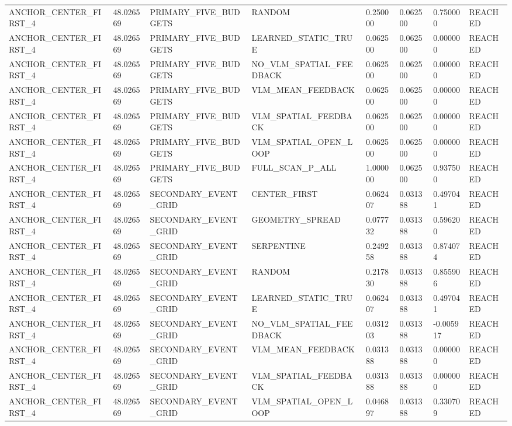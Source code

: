 \begin{tabular}{llllllll}
ANCHOR\_CENTER\_FIRST\_4 & 48.026569 & PRIMARY\_FIVE\_BUDGETS & RANDOM & 0.250000 & 0.062500 & 0.750000 & REACHED \\
ANCHOR\_CENTER\_FIRST\_4 & 48.026569 & PRIMARY\_FIVE\_BUDGETS & LEARNED\_STATIC\_TRUE & 0.062500 & 0.062500 & 0.000000 & REACHED \\
ANCHOR\_CENTER\_FIRST\_4 & 48.026569 & PRIMARY\_FIVE\_BUDGETS & NO\_VLM\_SPATIAL\_FEEDBACK & 0.062500 & 0.062500 & 0.000000 & REACHED \\
ANCHOR\_CENTER\_FIRST\_4 & 48.026569 & PRIMARY\_FIVE\_BUDGETS & VLM\_MEAN\_FEEDBACK & 0.062500 & 0.062500 & 0.000000 & REACHED \\
ANCHOR\_CENTER\_FIRST\_4 & 48.026569 & PRIMARY\_FIVE\_BUDGETS & VLM\_SPATIAL\_FEEDBACK & 0.062500 & 0.062500 & 0.000000 & REACHED \\
ANCHOR\_CENTER\_FIRST\_4 & 48.026569 & PRIMARY\_FIVE\_BUDGETS & VLM\_SPATIAL\_OPEN\_LOOP & 0.062500 & 0.062500 & 0.000000 & REACHED \\
ANCHOR\_CENTER\_FIRST\_4 & 48.026569 & PRIMARY\_FIVE\_BUDGETS & FULL\_SCAN\_P\_ALL & 1.000000 & 0.062500 & 0.937500 & REACHED \\
ANCHOR\_CENTER\_FIRST\_4 & 48.026569 & SECONDARY\_EVENT\_GRID & CENTER\_FIRST & 0.062407 & 0.031388 & 0.497041 & REACHED \\
ANCHOR\_CENTER\_FIRST\_4 & 48.026569 & SECONDARY\_EVENT\_GRID & GEOMETRY\_SPREAD & 0.077732 & 0.031388 & 0.596200 & REACHED \\
ANCHOR\_CENTER\_FIRST\_4 & 48.026569 & SECONDARY\_EVENT\_GRID & SERPENTINE & 0.249258 & 0.031388 & 0.874074 & REACHED \\
ANCHOR\_CENTER\_FIRST\_4 & 48.026569 & SECONDARY\_EVENT\_GRID & RANDOM & 0.217830 & 0.031388 & 0.855906 & REACHED \\
ANCHOR\_CENTER\_FIRST\_4 & 48.026569 & SECONDARY\_EVENT\_GRID & LEARNED\_STATIC\_TRUE & 0.062407 & 0.031388 & 0.497041 & REACHED \\
ANCHOR\_CENTER\_FIRST\_4 & 48.026569 & SECONDARY\_EVENT\_GRID & NO\_VLM\_SPATIAL\_FEEDBACK & 0.031203 & 0.031388 & -0.005917 & REACHED \\
ANCHOR\_CENTER\_FIRST\_4 & 48.026569 & SECONDARY\_EVENT\_GRID & VLM\_MEAN\_FEEDBACK & 0.031388 & 0.031388 & 0.000000 & REACHED \\
ANCHOR\_CENTER\_FIRST\_4 & 48.026569 & SECONDARY\_EVENT\_GRID & VLM\_SPATIAL\_FEEDBACK & 0.031388 & 0.031388 & 0.000000 & REACHED \\
ANCHOR\_CENTER\_FIRST\_4 & 48.026569 & SECONDARY\_EVENT\_GRID & VLM\_SPATIAL\_OPEN\_LOOP & 0.046897 & 0.031388 & 0.330709 & REACHED \\

\end{tabular}
